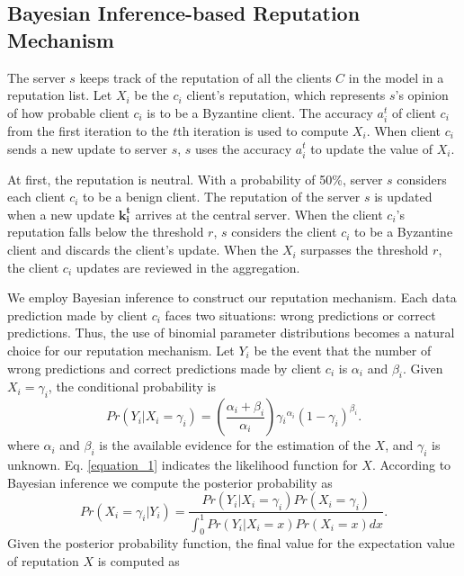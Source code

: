 \documentclass[journal]{IEEEtran}
\begin{document}
\subsection{Bayesian Inference-based Reputation Mechanism}
The server $s$ keeps track of the reputation of all the clients $C$ in the model in a reputation list. Let $X_i$ be the $c_i$ client's reputation, which represents $s$'s opinion of how probable client $c_i$ is to be a Byzantine client. The accuracy $a_i^t$ of client $c_i$ from the first iteration to the $t$th iteration is used to compute $X_i$. When client $c_i$ sends a new update to server $s$, $s$ uses the accuracy $a_i^t$ to update the value of $X_i$.
\par At first, the reputation is neutral. With a probability of 50\%, server $s$ considers each client $c_i$ to be a benign client. The reputation of the server $s$ is updated when a new update $\mathbf{k_i^t}$ arrives at the central server. When the client $c_i$'s reputation falls below the threshold $r$, $s$ considers the client $c_i$ to be a Byzantine client and discards the client's update. When the $X_i$ surpasses the threshold $r$, the client $c_i$ updates are reviewed in the aggregation.
\par We employ Bayesian inference to construct our reputation mechanism. Each data prediction made by client $c_i$ faces two situations: wrong predictions or correct predictions. Thus, the use of binomial parameter distributions becomes a natural choice for our reputation mechanism. Let $Y_i$ be the event that the number of wrong predictions and correct predictions made by client $c_i$ is $\alpha_i$ and $\beta_i$. Given $X_i=\gamma_i$, the conditional probability is 
\begin{equation}
    Pr(Y_i|X_i=\gamma _i)=\left ( \frac{\alpha _i+\beta _i}{\alpha _i} \right )\gamma {_{i}}^{\alpha_i}\left ( 1-\gamma_{i} \right )^{\beta_{i}}\label{equation_1}.
\end{equation}
where $\alpha_i$ and $\beta_i$ is the available evidence for the estimation of the $X$, and $\gamma_i$ is unknown. Eq. \ref{equation_1} indicates the likelihood function for $X$. According to Bayesian inference we compute the posterior probability as
\begin{equation}
    Pr(X_i=\gamma _i|Y_i)=\frac{Pr\left ( Y_{i}|X_{i}=\gamma_{i} \right )Pr(X_{i}=\gamma_{i})}{\int_{0}^{1}Pr\left ( Y_{i}|X_{i}=x \right )Pr(X_{i}=x)dx}\label{equation_2}.
\end{equation}
Given the posterior probability function, the final value for the expectation value of reputation $X$ is computed as
\end{document}
